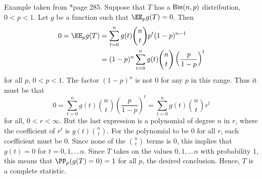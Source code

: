 \begin{exam} \label{exam: bin_comp_stat}
    Example taken from \cite{CasellaGeorge2001SI}*{page 285}. Suppose that $T$ has a ${\sf Bin} (n,p)$ distribution, $0<p<1$. Let $g$ be a function such that $\EE_{p} g(T) = 0$. Then
    \begin{align*}
        0 = \EE_{p} g(T) & = \sum_{t=0}^{n} g(t) \binom{n}{t} p^{t} (1-p)^{n-1}                        \\
                         & = (1-p)^n \sum_{t=0}^{n} g(t) \binom{n}{t} \left( \frac{p}{1-p} \right)^{t}
    \end{align*}
    for all $p$, $0<p<1$. The factor $(1-p)^n$ is not 0 for any $p$ in this range. Thus it must be that
    \begin{equation*}
        0 = \sum_{t=0}^{n} g(t) \binom{n}{t} \left( \frac{p}{1-p} \right)^{t} = \sum_{t=0}^{n} g(t) \binom{n}{t} r^t
    \end{equation*}
    for all, $0 < r < \infty$. But the last expression is a polynomial of degree $n$ in $r$, where the coefficient of $r^t$ is $g(t) \binom{n}{t}$. For the polynomial to be $0$ for all $r$, each coefficient must be $0$. Since none of the $\binom{n}{t}$ terms is $0$, this implies that $g(t) = 0$ for $t=0,1,\ldots n$. Since $T$ takes on the values $0,1,\ldots n$ with probability $1$, this means that $\PP_p (g(T) = 0) = 1$ for all $p$, the desired conclusion. Hence, $T$ is a complete statistic.
\end{exam}

